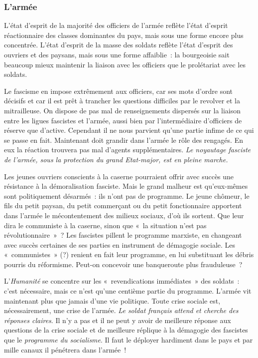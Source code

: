\documentclass[french,twoside]{book} %
\begin{document}
\subsubsection[{L’armée}]{L’armée}
\noindent L’état d’esprit de la majorité des officiers de l’armée reflète l’état d’esprit réactionnaire des classes dominantes du pays, mais sous une forme encore plus concentrée. L’état d’esprit de la masse des soldats reflète l’état d’esprit des ouvriers et des paysans, mais sous une forme affaiblie : la bourgeoisie sait beaucoup mieux maintenir la liaison avec les officiers que le prolétariat avec les soldats.\par
Le fascisme en impose extrêmement aux officiers, car ses mots d’ordre sont décisifs et car il est prêt à trancher les questions difficiles par le revolver et la mitrailleuse. On dispose de pas mal de renseignements dispersés sur la liaison entre les ligues fascistes et l’armée, aussi bien par l’intermédiaire d’officiers de réserve que d’active. Cependant il ne nous parvient qu’une partie infime de ce qui se passe en fait. Maintenant doit grandir dans l’armée le rôle des rengagés. En eux la réaction trouvera pas mal d’agents supplémentaires. \emph{Le noyautage fasciste de l’armée, sous la protection du grand Etat-major, est en pleine marche.}\par
Les jeunes ouvriers conscients à la caserne pourraient offrir avec succès une résistance à la démoralisation fasciste.  Mais le grand malheur est qu’eux-mêmes sont politiquement désarmés : ils n’ont pas de programme. Le jeune chômeur, le fils du petit paysan, du petit commerçant ou du petit fonctionnaire apportent dans l’armée le mécontentement des milieux sociaux, d’où ils sortent. Que leur dira le communiste à la caserne, sinon que « la situation n’est pas révolutionnaire » ? Les fascistes pillent le programme marxiste, en changeant avec succès certaines de ses parties en instrument de démagogie sociale. Les « communistes » (?) renient en fait leur programme, en lui substituant les débris pourris du réformisme. Peut-on concevoir une banqueroute plus frauduleuse ?\par
L’\emph{Humanité} se concentre sur les « revendications immédiates » des soldats : c’est nécessaire, mais ce n’est qu’une centième partie du programme. L’armée vit maintenant plus que jamais d’une vie politique. Toute crise sociale est, nécessairement, une crise de l’armée. \emph{Le soldat français attend et cherche des réponses claires}. Il n’y a pas et il ne peut y avoir de meilleure réponse aux questions de la crise sociale et de meilleure réplique à la démagogie des fascistes que le \emph{programme du socialisme}. Il faut le déployer hardiment dans le pays et par mille canaux il pénétrera dans l’armée !
\end{document}
